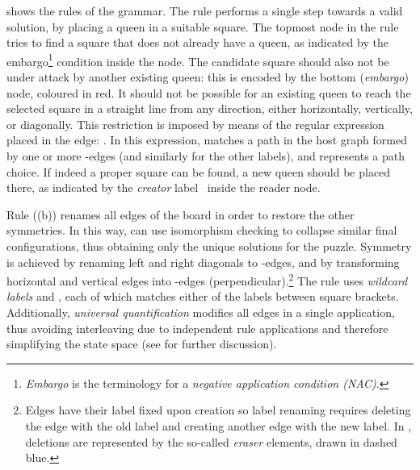  shows the rules of the grammar. The  rule
performs a single step towards a valid solution, by placing a queen in a
suitable square. The topmost node in the rule tries to find a square that does
not already have a queen, as indicated by the embargo\footnote{\emph{Embargo}
is the \GROOVE terminology for a \emph{negative application condition (NAC)}.}
condition  inside the node. The candidate square
should also not be under attack by another existing queen: this is encoded by
the bottom (\emph{embargo}) node, coloured in red. It should not be possible
for an existing queen to reach the selected square in a straight line from any
direction, either horizontally, vertically, or diagonally. This restriction is
imposed by means of the regular expression placed in the edge:
. In this expression,
 matches a path in the host graph formed by one or
more -edges (and similarly for the other labels), and
\glabel{\color{embargo_c}$|$} represents a path choice. If indeed a proper
square can be found, a new queen should be placed there, as indicated by the
\emph{creator} label~ inside the reader node.


Rule  ((b)) renames all edges of the board
in order to restore the other symmetries. In this way, \GROOVE can use
isomorphism checking to collapse similar final configurations, thus obtaining
only the unique solutions for the puzzle. Symmetry is achieved by renaming left
and right diagonals to -edges, and by transforming horizontal and
vertical edges into -edges (perpendicular).\footnote{Edges have their
label fixed upon creation so label renaming requires deleting the edge with
the old label and creating another edge with the new label. In \GROOVE,
deletions are represented by the so-called \emph{eraser} elements, drawn in
dashed blue.} The rule uses \emph{wildcard labels}
 and , each of
which matches either of the labels between square brackets. Additionally,
\emph{universal quantification} modifies all edges in a single application,
thus avoiding interleaving due to independent rule applications and therefore
simplifying the state space (see  for further discussion).

